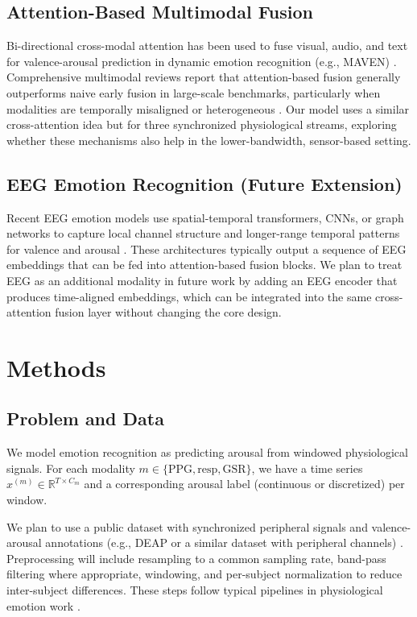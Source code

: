 \documentclass[conference]{IEEEtran}
\begin{document}
\subsection{Attention-Based Multimodal Fusion}
Bi-directional cross-modal attention has been used to fuse visual, audio, and text for valence-arousal prediction in dynamic emotion recognition (e.g., MAVEN) \cite{ahire_maven_2025,ahire_maven_nodate}. Comprehensive multimodal reviews report that attention-based fusion generally outperforms naive early fusion in large-scale benchmarks, particularly when modalities are temporally misaligned or heterogeneous \cite{wu_comprehensive_2025}. Our model uses a similar cross-attention idea but for three synchronized physiological streams, exploring whether these mechanisms also help in the lower-bandwidth, sensor-based setting.

\subsection{EEG Emotion Recognition (Future Extension)}
Recent EEG emotion models use spatial-temporal transformers, CNNs, or graph networks to capture local channel structure and longer-range temporal patterns for valence and arousal \cite{li_spatial_2025,cheng_eeg-based_2024,chen_eeg-based_2024,cao_emotion_2025}. These architectures typically output a sequence of EEG embeddings that can be fed into attention-based fusion blocks. We plan to treat EEG as an additional modality in future work by adding an EEG encoder that produces time-aligned embeddings, which can be integrated into the same cross-attention fusion layer without changing the core design.

\section{Methods}
\subsection{Problem and Data}
We model emotion recognition as predicting arousal from windowed physiological signals. For each modality $m \in \{\mathrm{PPG}, \mathrm{resp}, \mathrm{GSR}\}$, we have a time series $x^{(m)} \in \mathbb{R}^{T \times C_m}$ and a corresponding arousal label (continuous or discretized) per window.

We plan to use a public dataset with synchronized peripheral signals and valence-arousal annotations (e.g., DEAP or a similar dataset with peripheral channels) \cite{noauthor_datasets_nodate}. Preprocessing will include resampling to a common sampling rate, band-pass filtering where appropriate, windowing, and per-subject normalization to reduce inter-subject differences. These steps follow typical pipelines in physiological emotion work \cite{kacimi_comprehensive_2025,siddiqui_respiration_2021}.
\end{document}
